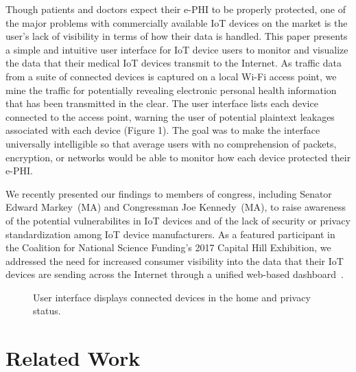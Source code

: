 Though patients and doctors expect their e-PHI to be properly protected, one
of the major problems with commercially available IoT devices on the market is
the user's lack of visibility in terms of how their data is handled. This
paper presents a simple and intuitive user interface for IoT device users to
monitor and visualize the data that their medical IoT devices transmit to the
Internet. As traffic data from a suite of connected devices is captured on a
local Wi-Fi access point, we mine the traffic for potentially revealing
electronic personal health information that has been transmitted in the clear.
The user interface lists each device connected to the access point, warning
the user of potential plaintext leakages associated with each device (Figure
1). The goal was to make the interface universally intelligible so that
average users with no comprehension of packets, encryption, or networks would
be able to monitor how each device protected their e-PHI.

We recently presented our findings to members of congress, including Senator
Edward Markey~(MA) and Congressman Joe Kennedy~(MA), to raise awareness of the
potential vulnerabilites in IoT devices and of the lack of security or privacy
standardization among IoT device manufacturers. As a featured
participant in the Coalition for National Science Funding's 2017 Capital Hill Exhibition,
we addressed the need for increased consumer visibility into the data that their
IoT devices are sending across the Internet through a unified web-based dashboard~\cite{cra}.
\begin{figure}[t]
  \centering
  \caption{User interface displays connected devices in the home and privacy status.}
  \label{fig:dashboard}
\end{figure}

\section{Related Work}

